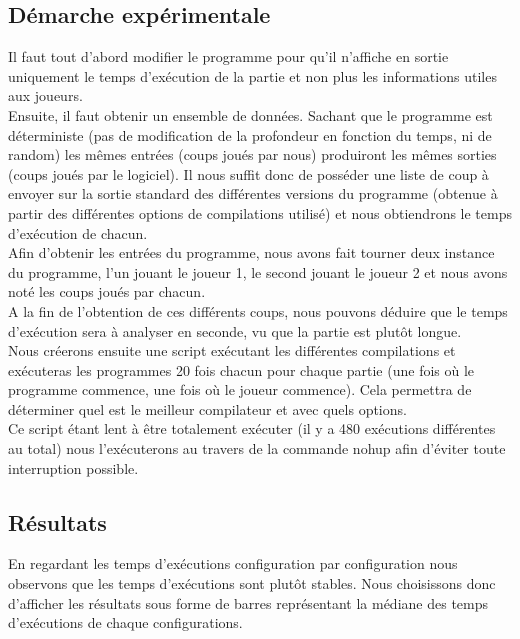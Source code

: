 \documentclass[
 aip,
 jmp,
 amsmath,amssymb,
 reprint
]{revtex4-1}
\begin{document}
\subsection{Démarche expérimentale}
Il faut tout d'abord modifier le programme pour qu'il n'affiche en sortie uniquement le temps d'exécution de la partie et non plus les informations utiles aux joueurs.\\
Ensuite, il faut obtenir un ensemble de données. Sachant que le programme est déterministe (pas de modification de la profondeur en fonction du temps, ni de random) les mêmes entrées (coups joués par nous) produiront les mêmes sorties (coups joués par le logiciel). Il nous suffit donc de posséder une liste de coup à envoyer sur la sortie standard des différentes versions du programme (obtenue à partir des différentes options de compilations utilisé) et nous obtiendrons le temps d'exécution de chacun.\\
Afin d'obtenir les entrées du programme, nous avons fait tourner deux instance du programme, l'un jouant le joueur 1, le second jouant le joueur 2 et nous avons noté les coups joués par chacun.\\
A la fin de l'obtention de ces différents coups, nous pouvons déduire que le temps d'exécution sera à analyser en seconde, vu que la partie est plutôt longue.\\
Nous créerons ensuite une script exécutant les différentes compilations et exécuteras les programmes 20 fois chacun pour chaque partie (une fois où le programme commence, une fois où le joueur commence). Cela permettra de déterminer quel est le meilleur compilateur et avec quels options.\\
Ce script étant lent à être totalement exécuter (il y a 480 exécutions différentes au total) nous l'exécuterons au travers de la commande nohup afin d'éviter toute interruption possible.\\

\subsection{Résultats}
En regardant les temps d'exécutions configuration par configuration nous observons que les temps d'exécutions sont plutôt stables. Nous choisissons donc d'afficher les résultats sous forme de barres représentant la médiane des temps d'exécutions de chaque configurations.\\
\end{document}
